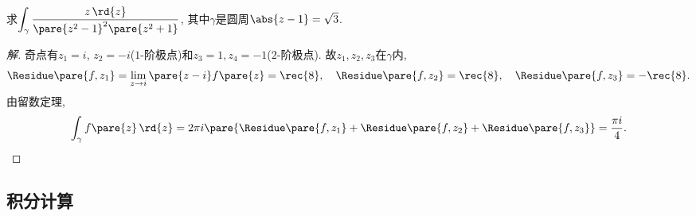 \documentclass{ctexart}
\begin{document}
\begin{sample}
    \begin{ex}
        求$\displaystyle \int_\gamma \frac{z\,\rd{z}}{\pare{z^2-1}^2\pare{z^2+1}}$, 其中$\gamma$是圆周$\abs{z-1} = \sqrt{3}$.
    \end{ex}
    \begin{proof}[解]
        奇点有$z_1 = i$, $z_2=-i$($1$-阶极点)和$z_3 = 1, z_4 = -1$($2$-阶极点). 故$z_1, z_2, z_3$在$\gamma$内,
        \[ \Residue\pare{f,z_1} = \lim_{z\rightarrow i}\pare{z-i}f\pare{z} = \rec{8},\quad \Residue\pare{f,z_2} = \rec{8}, \quad \Residue\pare{f,z_3} = -\rec{8}. \]
        由留数定理,
        \[ \int_\gamma f\pare{z}\,\rd{z} = 2\pi i\pare{\Residue\pare{f,z_1} + \Residue\pare{f,z_2} + \Residue\pare{f,z_3}} = \frac{\pi i}{4}. \qedhere \]
    \end{proof}
\end{sample}


\subsection{积分计算} %
\label{sub:积分计算}
\end{document}
